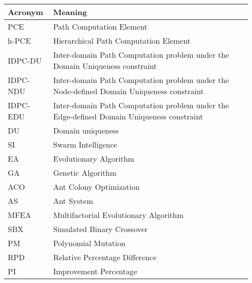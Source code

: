 \fontsize{13}{16}
\selectfont
\begin{center}
	\begin{tabular}{|p{1in}|p{5in}|}
		\hline
		\textbf{Acronym} & \textbf{Meaning}  \\ \hline
		PCE & Path Computation Element	\\ \hline
		h-PCE & Hierarchical Path Computation Element	\\ \hline
		IDPC-DU & Inter-domain Path Computation problem under the Domain Uniqueness constraint \\ \hline
		IDPC-NDU & Inter-domain Path Computation problem under the Node-defined Domain Uniqueness constraint \\ \hline
		IDPC-EDU & Inter-domain Path Computation problem under the Edge-defined Domain Uniqueness constraint \\ \hline
		DU & Domain uniqueness \\ \hline
		SI & Swarm Intelligence \\ \hline
		EA & Evolutionary Algorithm \\ \hline
		GA & Genetic Algorithm  \\ \hline
		ACO & Ant Colony Optimization \\ \hline
		AS & Ant System \\ \hline
		MFEA & Multifactorial Evolutionary Algorithm \\ \hline
		SBX & Simulated Binary Crossover\\ \hline
		PM & Polynomial Mutation\\ \hline
		RPD & Relative Percentage Difference\\ \hline
		PI & Improvement Percentage\\ \hline
	\end{tabular}    
\end{center}


\pagebreak